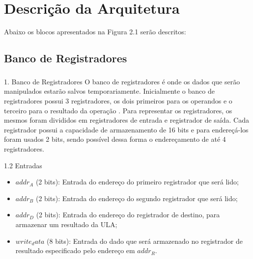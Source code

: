 \documentclass{report}
\begin{document}
\paragraph{}

  

\chapter{Descrição da Arquitetura}

  Abaixo os blocos apresentados na Figura 2.1 serão descritos:

    
  \section{Banco de Registradores}
  \paragraph{}
  
  1.	Banco de Registradores
O banco de registradores é onde os dados que serão manipulados estarão salvos temporariamente. Inicialmente o banco de registradores possui 3 registradores, os dois primeiros para os operandos e o terceiro para o resultado da operação .
Para representar os registradores, os mesmos foram divididos em registradores de entrada e registrador de saída. Cada registrador possui a capacidade de armazenamento de 16 bits e para endereçá-los foram usados 2 bits, sendo possível dessa forma o endereçamento de até 4 registradores.

1.2 Entradas
\begin{itemize}
        \item $addr_A$ (2 bits): Entrada do endereço do primeiro registrador que será lido;
		\item $addr_B$ (2 bits): Entrada do endereço do segundo registrador que será lido;
		\item $addr_D$ (2 bits): Entrada do endereço do registrador de destino, para 					armazenar um resultado da ULA;
		\item $write_data$ (8 bits): Entrada do dado que será armazenado no registrador de 				resultado especificado pelo endereço em $addr_R$.
\end{itemize}
\end{document}
